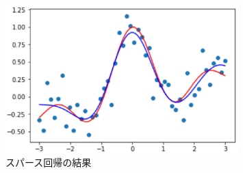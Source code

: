 \documentclass[fleqn]{jsarticle}
\begin{document}
\begin{figure}[h]
  \begin{center}
    \includegraphics[width=0.8\textwidth]{figs/sparse_regression.eps}
  \end{center}
  \caption{スパース回帰の結果}
\end{figure}
\end{document}
